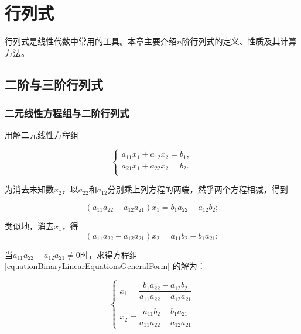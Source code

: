 \chapter{行列式}

行列式是线性代数中常用的工具。本章主要介绍$ n $阶行列式的定义、性质及其计算方法。

\section{二阶与三阶行列式}
\subsection{二元线性方程组与二阶行列式}

用解二元线性方程组

\begin{equation} \label{equationBinaryLinearEquationsGeneralForm}
	\left\{
	\begin{array}{r}
		a_{11}x_1 + a_{12}x_2 = b_1, \\
		a_{21}x_1 + a_{22}x_2 = b_2. \\
	\end{array} \right.
\end{equation}

为消去未知数$ x_2 $，以$ a_{22} $和$ a_{12} $分别乘上列方程的两端，然乎两个方程相减，得到

\begin{equation}
	(a_{11}a_{22}-a_{12}a_{21})x_{1} = b_{1}a_{22}-a_{12}b_{2};
\end{equation}

类似地，消去$ x_1 $，得
\begin{equation}
	(a_{11}a_{22}-a_{12}a_{21})x_{2} = a_{11}b_{2}-b_{1}a_{21};
\end{equation}

当$ a_{11}a_{22}-a_{12}a_{21} \ne 0 $时，求得方程组 \ref{equationBinaryLinearEquationsGeneralForm} 的解为：

\begin{equation} \label{equationBinaryLinearEquationsGeneralFormResult}
	\left\{
	\begin{array}{r}
	x_{1} = \dfrac{b_{1}a_{22}-a_{12}b_{2}}{a_{11}a_{22}-a_{12}a_{21}} \\
	\\
	x_{2} = \dfrac{a_{11}b_{2}-b_{1}a_{21}}{a_{11}a_{22}-a_{12}a_{21}}
	
	\end{array} \right.
\end{equation}

